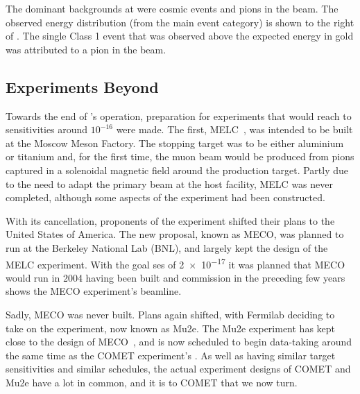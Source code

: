The dominant backgrounds at \sindrumII were cosmic events and pions in the beam.  
The observed energy distribution (from the main event category) is shown to the right of .  
The single Class 1 event that was observed above the expected \mueconv energy in gold was attributed to a pion in the beam.

\subsection{Experiments Beyond \sindrumII}
\FigMuecMECO
Towards the end of \sindrumII's operation, preparation for experiments that would reach to sensitivities around $10^{-16}$ were made.
The first, MELC~\cite{MELC}, was intended to be built at the Moscow Meson Factory.
The stopping target was to be either aluminium or titanium and, for the first time, the muon beam would be produced from pions captured in a solenoidal magnetic field around the production target.
Partly due to the need to adapt the primary beam at the host facility, MELC was never completed, although some aspects of the experiment had been constructed.

With its cancellation, proponents of the experiment shifted their plans to the United States of America.  
The new proposal, known as MECO, was planned to run at the Berkeley National Lab (BNL), and largely kept the design of the MELC experiment.
With the goal \ac{ses} of \num{2e-17} it was planned that MECO would run in 2004 having been built and commission in the preceding few years~\cite{MECO}
 shows the MECO experiment's beamline.

Sadly, MECO was never built.  
Plans again shifted, with Fermilab deciding to take on the experiment, now known as Mu2e.
The Mu2e experiment has kept close to the design of MECO~\cite{Mu2e2014}, and is now scheduled to begin data-taking around the same time as the COMET experiment's \phaseII.
As well as having similar target sensitivities and similar schedules, the actual experiment designs of COMET and Mu2e have a lot in common, and it is to COMET that we now turn.
